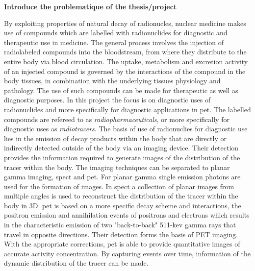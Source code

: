 \textbf{Introduce the problematique of the thesis/project}

By exploiting properties of natural decay of radionucles, nuclear medicine makes use of compounds which are labelled with radionuclides for diagnostic and therapeutic use in medicine. The general process involves the injection of radiolabeled compounds into the bloodstream, from where they distribute to the entire body via blood circulation. The uptake, metabolism and excretion activity of an injected compound is governed by the interactions of the compound in the body tissues, in combination with the underlying tissues physiology and pathology. 
The use of such compounds can be made for therapeutic as well as diagnostic purposes. In this project the focus is on diagnostic uses of radionuclides and more specifically for diagnostic applications in \gls{pet}.
The labelled compounds are refereed to as \textit{radiopharmaceuticals}, or more specifically for diagnostic uses as \textit{radiotracers}.
The basis of use of radionuclies for diagnostic use lies in the emission of decay products within the body that are directly or indirectly detected outside of the body via an imaging device. Their detection provides the information required to generate images of the distribution of the tracer within the body. The imaging techniques can be separated to planar gamma imaging, \gls{spect} and \gls{pet}. For planar gamma single emission photons are used for the formation of images. In \gls{spect} a collection of planar images from multiple angles is used to reconstruct the distribution of the tracer within the body in 3D. 
\Gls{pet} is based on a more specific decay scheme and interactions, the positron emission and annihilation events of positrons and electrons which results in the characteristic emission of two "back-to-back" 511-kev gamma rays that travel in opposite directions. Their detection forms the basis of PET imaging. 
\\
With the appropriate corrections, \gls{pet} is able to provide quantitative images of accurate activity concentration. By capturing events over time, information of the dynamic distribution of the tracer can be made. 

